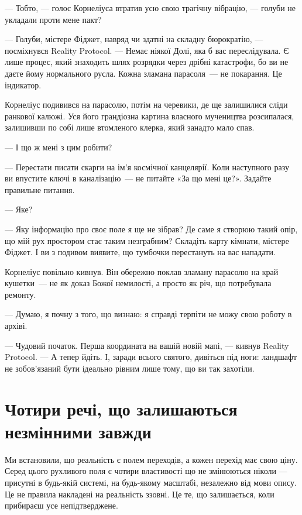 \documentclass[12pt, a4paper, openany]{book}
\begin{document}
\begin{realitybox}
--- Тобто, --- голос Корнеліуса втратив усю свою трагічну вібрацію, --- голуби не укладали проти мене пакт?

--- Голуби, містере Фіджет, навряд чи здатні на складну бюрократію, --- посміхнувся Reality Protocol. --- Немає ніякої Долі, яка б вас переслідувала. Є лише процес, який знаходить шлях розрядки через дрібні катастрофи, бо ви не даєте йому нормального русла. Кожна зламана парасоля~--- не покарання. Це індикатор.

\medskip
Корнеліус подивився на парасолю, потім на черевики, де ще залишилися сліди ранкової калюжі. Уся його грандіозна картина власного мучеництва розсипалася, залишивши по собі лише втомленого клерка, який занадто мало спав.

--- І що ж мені з цим робити?

--- Перестати писати скарги на ім'я космічної канцелярії. Коли наступного разу ви впустите ключі в каналізацію~--- не питайте «За що мені це?». Задайте правильне питання.

--- Яке?

--- Яку інформацію про своє поле я ще не зібрав? Де саме я створюю такий опір, що мій рух простором стає таким незграбним? Складіть карту кімнати, містере Фіджет. І ви з подивом виявите, що тумбочки перестануть на вас нападати.

\medskip
Корнеліус повільно кивнув. Він обережно поклав зламану парасолю на край кушетки~--- не як доказ Божої немилості, а просто як річ, що потребувала ремонту.

--- Думаю, я почну з того, що визнаю: я справді терпіти не можу свою роботу в архіві.

--- Чудовий початок. Перша координата на вашій новій мапі, --- кивнув Reality Protocol. --- А тепер йдіть. І, заради всього святого, дивіться під ноги: ландшафт не зобов'язаний бути ідеально рівним лише тому, що ви так захотіли.
\end{realitybox}

\chapter{Чотири речі, що залишаються незмінними завжди}

Ми встановили, що реальність є полем переходів, а кожен перехід має свою ціну. Серед цього рухливого поля є чотири властивості що не змінюються ніколи --- присутні в будь-якій системі, на будь-якому масштабі, незалежно від мови опису. Це не правила накладені на реальність ззовні. Це те, що залишається, коли прибираєш усе непідтверджене.
\end{document}
